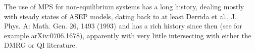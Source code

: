 
The use of MPS for non-equilibrium 
systems has a long history, dealing mostly with steady states of ASEP models,
dating back to at least Derrida et al., J. Phys. A: Math. Gen. 26, 1493 (1993)
and has a rich history since then (see for example arXiv:0706.1678), apparently
with very little intersecting with either the DMRG or QI literature.

